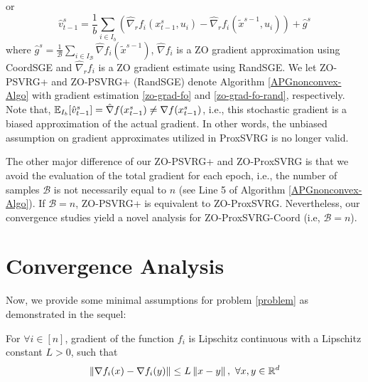 or 
\begin{equation}\label{zo-grad-fo-rand}
{\hat{v}}_{t-1}^s = \frac{1}{b} \sum_{i\in I_b}\left(\hat{\nabla}_r f_{i}(x_{t-1}^s, u_i)-\hat{\nabla}_r f_{i}(\tilde{x}^{s-1}, u_i)\right)+\hat{g}^s
\end{equation}
where $\hat{g}^s= \frac{1}{\mathcal{B}}\sum_{i\in I_{\mathcal{B}}}\hat{\nabla} f_{i}(\tilde{x}^{s-1})$,   $\hat{\nabla} f_{i}$ is a ZO gradient approximation using CoordSGE and $\hat{\nabla}_r f_{i}$ is a ZO gradient estimate using RandSGE.  We let ZO-PSVRG+ and ZO-PSVRG+ (RandSGE) denote Algorithm \ref{APGnonconvex-Algo} with gradient estimation \eqref{zo-grad-fo} and 
\eqref{zo-grad-fo-rand}, respectively. 
Note that, $\mathbb{E}_{I_b}[\hat{v}_{t-1}^s] = \hat{\nabla} f(x_{t-1}^s) \neq {\nabla} f(x_{t-1}^s)$, i.e., this stochastic gradient is a biased approximation of the actual gradient.
In other words, the unbiased assumption on gradient approximates utilized in ProxSVRG \cite{reddi2016proximal,li2018simple} is no longer valid. 
\iffalse
We emphasize that the biased ZO gradient estimation yields a fundamental challenge in analyzing ZO-PSVRG+.
Hence, adjusting the similar concepts from ProxSVRG to zeroth-order algorithm \ref{APGnonconvex-Algo} is not effortless and requires an elaborated analysis of ZO-PSVRG+. To tackle this issue, we derive an upper bound for the variance of the gradient approximation $\hat{v}_t^s$ by selecting an appropriate stepsize $\eta$ and smoothing parameter $\mu$ to control
variance of gradient estimation which is discussed later.
\fi


The other major difference of our ZO-PSVRG+  and ZO-ProxSVRG is that we avoid the evaluation of the total gradient for each epoch, i.e., the number of samples $\mathcal{B}$ is not necessarily equal to $n$ (see Line 5 of Algorithm \ref{APGnonconvex-Algo}).  If $\mathcal{B} = n$, ZO-PSVRG+ is equivalent to ZO-ProxSVRG. Nevertheless, our convergence studies yield a novel analysis for ZO-ProxSVRG-Coord (i.e, $\mathcal{B} = n$).

\section{Convergence Analysis}
Now, we provide some
minimal assumptions for problem \eqref{problem} as demonstrated in the sequel:
\begin{assumption}\label{Lip-Zoo}
For $\forall i\in [n]$, gradient of the function $f_i$ is Lipschitz continuous with a Lipschitz constant $L > 0$, such that 
\[
\left\lVert\nabla f_i(x) - \nabla f_i(y)\right\rVert\leq L \left\lVert x-y\right\rVert,\,\,\forall x,y\in\mathbb{R}^d
\]
\end{assumption}

